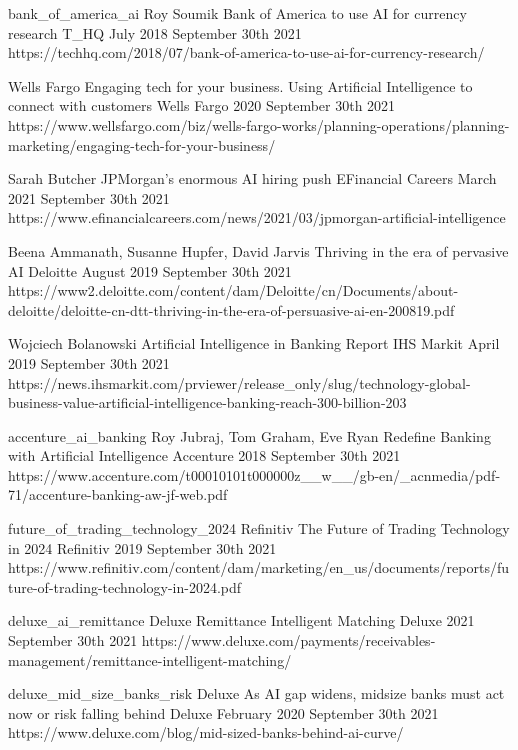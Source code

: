 \begin{thebibliography}{100}
\onlinebibitem
{bank_of_america_ai}
{Roy Soumik}
{Bank of America to use AI for currency research}
{T\_HQ}
{July 2018}
{September 30th 2021}
{https://techhq.com/2018/07/bank-of-america-to-use-ai-for-currency-research/}

{Wells Fargo}
{Engaging tech for your business. Using Artificial Intelligence to connect with customers}
{Wells Fargo}
{2020}
{September 30th 2021}
{https://www.wellsfargo.com/biz/wells-fargo-works/planning-operations/planning-marketing/engaging-tech-for-your-business/}

{Sarah Butcher}
{JPMorgan's enormous AI hiring push}
{EFinancial Careers}
{March 2021}
{September 30th 2021}
{https://www.efinancialcareers.com/news/2021/03/jpmorgan-artificial-intelligence}

{Beena Ammanath, Susanne Hupfer, David Jarvis}
{Thriving in the era of pervasive AI}
{Deloitte}
{August 2019}
{September 30th 2021}
{https://www2.deloitte.com/content/dam/Deloitte/cn/Documents/about-deloitte/deloitte-cn-dtt-thriving-in-the-era-of-persuasive-ai-en-200819.pdf}

{Wojciech Bolanowski}
{Artificial Intelligence in Banking Report}
{IHS Markit}
{April 2019}
{September 30th 2021}
{https://news.ihsmarkit.com/prviewer/release\_only/slug/technology-global-business-value-artificial-intelligence-banking-reach-300-billion-203}

\onlinebibitem
{accenture_ai_banking}
{Roy Jubraj, Tom Graham, Eve Ryan}
{Redefine Banking with Artificial Intelligence}
{Accenture}
{2018}
{September 30th 2021}
{https://www.accenture.com/t00010101t000000z\_\_w\_\_/gb-en/\_acnmedia/pdf-71/accenture-banking-aw-jf-web.pdf}

\onlinebibitem
{future_of_trading_technology_2024}
{Refinitiv}
{The Future of Trading Technology in 2024}
{Refinitiv}
{2019}
{September 30th 2021}
{https://www.refinitiv.com/content/dam/marketing/en\_us/documents/reports/future-of-trading-technology-in-2024.pdf}

\onlinebibitem
{deluxe_ai_remittance}
{Deluxe}
{Remittance Intelligent Matching}
{Deluxe}
{2021}
{September 30th 2021}
{https://www.deluxe.com/payments/receivables-management/remittance-intelligent-matching/}

\onlinebibitem
{deluxe_mid_size_banks_risk}
{Deluxe}
{As AI gap widens, midsize banks must act now or risk falling behind}
{Deluxe}
{February 2020}
{September 30th 2021}
{https://www.deluxe.com/blog/mid-sized-banks-behind-ai-curve/}


\end{thebibliography}
